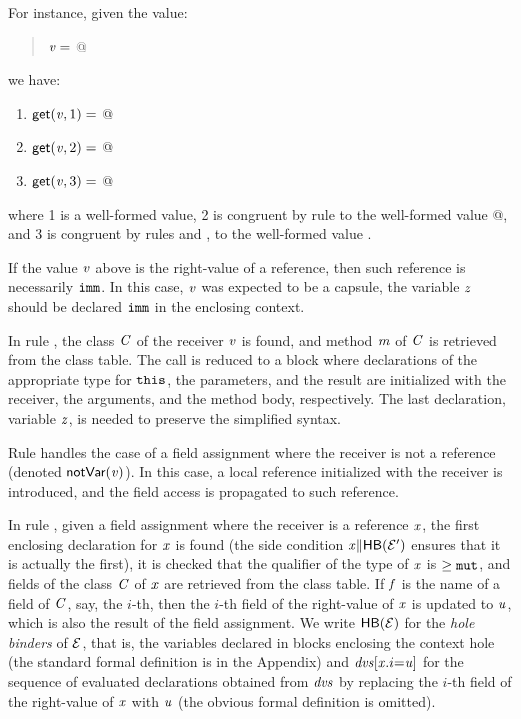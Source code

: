 For instance, given the value:
\begin{quote}
$\mathit{v}=$
@
\end{quote}
we have:
\begin{enumerate}
\item $\textsf{get}(\mathit{v},1)=$
@
\item $\textsf{get}(\mathit{v},2)=$
@
\item $\textsf{get}(\mathit{v},3)=$
@
\end{enumerate}
where 1 is a well-formed value, 2 is congruent by rule  to the  well-formed value
@, and 3 is congruent by rules  and , to the well-formed value \Q@z@.

If the value $\mathit{v}$ above is the right-value of a reference, then such reference is necessarily $\texttt{imm}$. In this case, $\mathit{v}$ 
was expected to be a capsule, the variable $\mathit{z}$ should be declared $\texttt{imm}$ in the enclosing context.


In rule , the class $\mathit{C}$ of the receiver $\mathit{v}$ is found, and method $\mathit{m}$ of $\mathit{C}$ is retrieved from the class table. The call is reduced to a block where declarations of the appropriate type for $\texttt{this}$, the parameters, and the result are initialized with the receiver, the arguments, and the method body, respectively. The last declaration, variable $\mathit{z}$, is
 needed to preserve the simplified syntax.

Rule  handles the case of a field assignment where the receiver is not a reference (denoted ${\textsf{notVar}}(\mathit{v})$). In this case, a local reference initialized with the receiver is introduced, and the field access is propagated to such reference. 

In rule , given a field assignment where the receiver is a reference $\mathit{x}$, the first enclosing declaration for $\mathit{x}$ is found (the side condition {$\mathit{x}{\parallel}\textsf{HB}({\cal{E}'})$} ensures that it is actually the first), it is checked that the qualifier of the type of $\mathit{x}$ is $\geq\texttt{mut}$, and fields of the class $\mathit{C}$ of $\mathit{x}$ are retrieved from the class table. If $\mathit{f}$ is the name of a field of $\mathit{C}$, say, the $i$-th, then the $i$-th field of the right-value of $\mathit{x}$ is updated to $\mathit{u}$, which is also the result of the field assignment. 
We write $\textsf{HB}({\cal{E}})$ for the \emph{hole binders} of ${\cal{E}}$, that is, the variables declared in blocks enclosing the
context hole (the standard formal definition is in the Appendix) and ${\mathit{dvs}[\mathit{x}.i{=}{\mathit{u}}]}$ for the sequence of evaluated declarations obtained from $\mathit{dvs}$ by replacing the $i$-th field of the right-value of $\mathit{x}$ with ${\mathit{u}}$ (the obvious formal definition is omitted).

